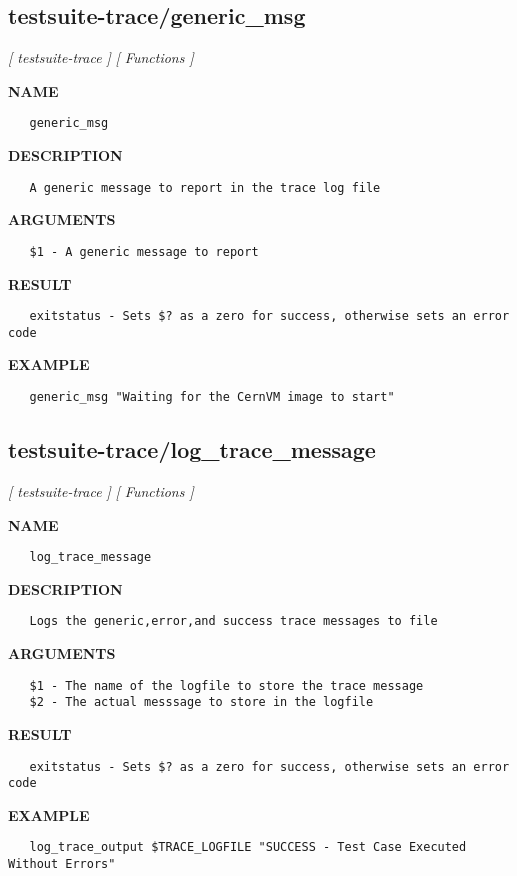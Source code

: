 \subsection{testsuite-trace/generic\_msg}
\textsl{[ testsuite-trace ]}
\textsl{[ Functions ]}

\label{ch:robo54}
\label{ch:testsuite_trace_generic_msg}
\textbf{NAME}
\begin{verbatim}
   generic_msg
\end{verbatim}
\textbf{DESCRIPTION}
\begin{verbatim}
   A generic message to report in the trace log file
\end{verbatim}
\textbf{ARGUMENTS}
\begin{verbatim}
   $1 - A generic message to report
\end{verbatim}
\textbf{RESULT}
\begin{verbatim}
   exitstatus - Sets $? as a zero for success, otherwise sets an error code
\end{verbatim}
\textbf{EXAMPLE}
\begin{verbatim}
   generic_msg "Waiting for the CernVM image to start"
\end{verbatim}
\newpage
\subsection{testsuite-trace/log\_trace\_message}
\textsl{[ testsuite-trace ]}
\textsl{[ Functions ]}

\label{ch:robo55}
\label{ch:testsuite_trace_log_trace_message}
\textbf{NAME}
\begin{verbatim}
   log_trace_message
\end{verbatim}
\textbf{DESCRIPTION}
\begin{verbatim}
   Logs the generic,error,and success trace messages to file
\end{verbatim}
\textbf{ARGUMENTS}
\begin{verbatim}
   $1 - The name of the logfile to store the trace message
   $2 - The actual messsage to store in the logfile
\end{verbatim}
\textbf{RESULT}
\begin{verbatim}
   exitstatus - Sets $? as a zero for success, otherwise sets an error code
\end{verbatim}
\textbf{EXAMPLE}
\begin{verbatim}
   log_trace_output $TRACE_LOGFILE "SUCCESS - Test Case Executed Without Errors"
\end{verbatim}
\newpage
